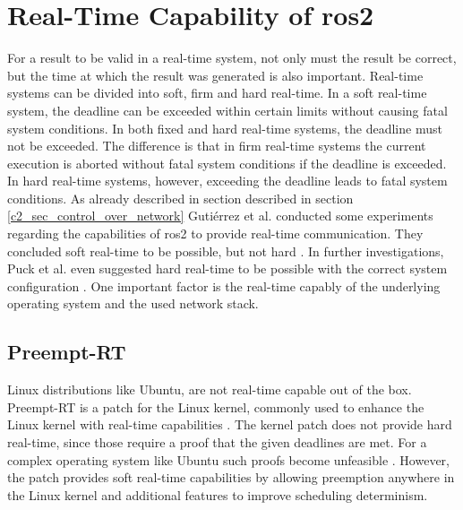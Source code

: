 \section{Real-Time Capability of \gls{ros2}}
For a result to be valid in a real-time system, not only must the result be correct, but the time at which the result was generated is also important. Real-time systems can be divided into soft, firm and hard real-time. In a soft real-time system, the deadline can be exceeded within certain limits without causing fatal system conditions. In both fixed and hard real-time systems, the deadline must not be exceeded. The difference is that in firm real-time systems the current execution is aborted without fatal system conditions if the deadline is exceeded. In hard real-time systems, however, exceeding the deadline leads to fatal system conditions.\newline
As already described in section described in section \ref{c2_sec_control_over_network} Gutiérrez et al. conducted some experiments regarding the capabilities of \gls{ros2} to provide real-time communication. They concluded soft real-time to be possible, but not hard \cite{gutierrez_towards_2018}. In further investigations, Puck et al. even suggested hard real-time to be possible with the correct system configuration \cite{puck_performance_2021}. One important factor is the real-time capably of the underlying operating system and the used network stack.

\subsection{Preempt-RT}
Linux distributions like Ubuntu, are not real-time capable out of the box. Preempt-RT is a patch for the Linux kernel, commonly used to enhance the Linux kernel with real-time capabilities \cite{noauthor_realtimestart_nodate}. The kernel patch does not provide hard real-time, since those require a proof that the given deadlines are met. For a complex operating system like Ubuntu such proofs become unfeasible \cite{puck_distributed_2020}. However, the patch provides soft real-time capabilities by allowing preemption anywhere in the Linux kernel and additional features to improve scheduling determinism.

